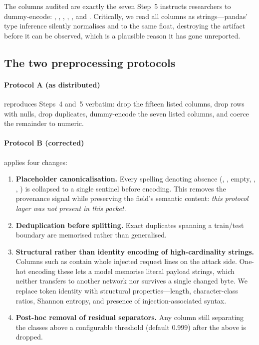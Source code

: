 The columns audited are exactly the seven  Step~5 instructs
researchers to dummy-encode: , ,
, ,
,  and .
Critically, we read all columns as strings---pandas' type inference silently
normalises  and  to the same float, destroying the artifact
before it can be observed, which is a plausible reason it has gone unreported.

\subsection{The two preprocessing protocols}

\paragraph{Protocol A (as distributed)} reproduces  Steps~4
and~5 verbatim: drop the fifteen listed columns, drop rows with nulls, drop
duplicates, dummy-encode the seven listed columns, and coerce the remainder to
numeric.

\paragraph{Protocol B (corrected)} applies four changes:

\begin{enumerate}
\item \textbf{Placeholder canonicalisation.} Every spelling denoting absence
(, , empty, , , ) is
collapsed to a single sentinel before encoding. This removes the provenance
signal while preserving the field's semantic content: \emph{this protocol layer
was not present in this packet}.
\item \textbf{Deduplication before splitting.} Exact duplicates spanning a
train/test boundary are memorised rather than generalised.
\item \textbf{Structural rather than identity encoding of high-cardinality
strings.} Columns such as  contain whole injected
request lines on the attack side. One-hot encoding these lets a model memorise
literal payload strings, which neither transfers to another network nor
survives a single changed byte. We replace token identity with structural
properties---length, character-class ratios, Shannon entropy, and presence of
injection-associated syntax.
\item \textbf{Post-hoc removal of residual separators.} Any column still
separating the classes above a configurable threshold (default 0.999) after the
above is dropped.
\end{enumerate}

